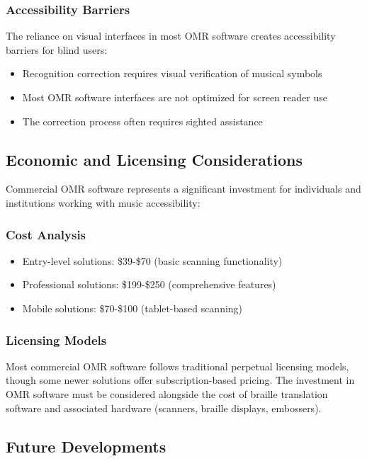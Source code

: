 \subsubsection{Accessibility Barriers}
The reliance on visual interfaces in most OMR software creates accessibility barriers for blind users:
\begin{itemize}
    \item Recognition correction requires visual verification of musical symbols
    \item Most OMR software interfaces are not optimized for screen reader use
    \item The correction process often requires sighted assistance
\end{itemize}

\subsection{Economic and Licensing Considerations}

Commercial OMR software represents a significant investment for individuals and institutions working with music accessibility:

\subsubsection{Cost Analysis}
\begin{itemize}
    \item Entry-level solutions: \$39-\$70 (basic scanning functionality)
    \item Professional solutions: \$199-\$250 (comprehensive features)
    \item Mobile solutions: \$70-\$100 (tablet-based scanning)
\end{itemize}

\subsubsection{Licensing Models}
Most commercial OMR software follows traditional perpetual licensing models, though some newer solutions offer subscription-based pricing. The investment in OMR software must be considered alongside the cost of braille translation software and associated hardware (scanners, braille displays, embossers).

\subsection{Future Developments}

